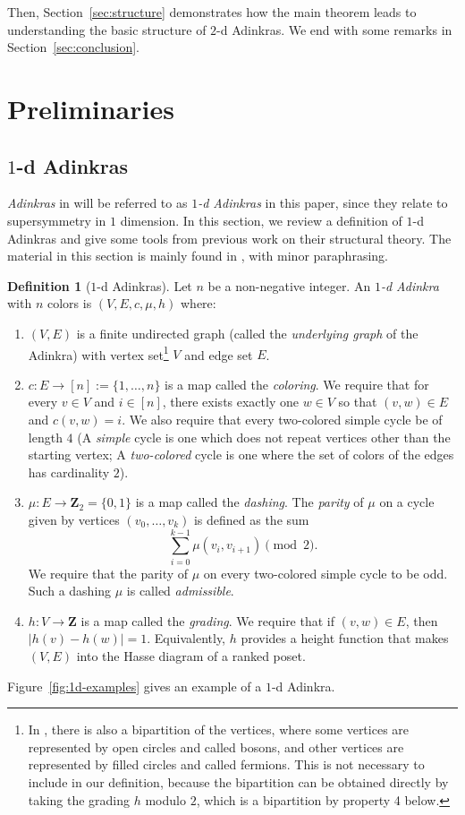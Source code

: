 \documentclass[12pt,twoside,singlespace]{article}
\numberwithin{equation}{section}
\theoremstyle{definition}
\newtheorem{definition}[equation]{Definition}
\newcommand{\ZZ}{\mathbf{Z}}
\begin{document}
Then, Section~\ref{sec:structure} demonstrates how the main theorem leads to understanding the basic structure of $2$-d Adinkras. We end with some remarks in Section~\ref{sec:conclusion}.

\section{Preliminaries}
\label{sec:prelim}

\subsection{$1$-d Adinkras}
\label{sec:1d}
\emph{Adinkras} in \cite{d2l:first,d2l:graph-theoretic,zhang:adinkras} will be referred to as \emph{$1$-d Adinkras} in this paper, since they relate to supersymmetry in $1$ dimension. In this section, we  review a definition of $1$-d Adinkras and give some tools from previous work on their structural theory. The material in this section is mainly found in \cite{d2l:omni,zhang:adinkras}, with minor paraphrasing. 


\begin{definition}[$1$-d Adinkras]
Let $n$ be a non-negative integer.  An \emph{$1$-d Adinkra} with $n$ colors is $(V,E,c,\mu,h)$ where: 

\begin{enumerate}
\item $(V,E)$ is a finite undirected graph (called the \emph{underlying graph} of the Adinkra) with vertex set\footnote{In \cite{d2l:first,d2l:graph-theoretic}, there is also a bipartition of the vertices, where some vertices are represented by open circles and called bosons, and other vertices are represented by filled circles and called fermions.  This is not necessary to include in our definition, because the bipartition can be obtained directly by taking the grading $h$ modulo $2$, which is a bipartition by property 4 below.} $V$ and edge set $E$.
\item $c:E\to [n] := \{1,\ldots,n\}$ is a map called the \emph{coloring}. We require that for every $v\in V$ and $i \in [n]$, there exists exactly one $w\in V$ so that $(v,w)\in E$ and $c(v,w)=i$. We also require that every two-colored simple cycle be of length $4$ (A \emph{simple} cycle is one which does not repeat vertices other than the starting vertex; A \emph{two-colored} cycle is one where the set of colors of the edges has cardinality $2$).
\item $\mu:E\to \ZZ_2=\{0,1\}$ is a map called the \emph{dashing}.  The \emph{parity} of $\mu$ on a cycle given by vertices $(v_0,\ldots,v_k)$ is defined as the sum
\[\sum_{i=0}^{k-1}\mu(v_i,v_{i+1})\pmod{2}.\]
We require that the parity of $\mu$ on every two-colored simple cycle to be odd. Such a dashing $\mu$ is called \emph{admissible}.
\item $h:V\to\ZZ$ is a map called the \emph{grading}. We require that if $(v,w)\in E$, then $|h(v)-h(w)|=1$. Equivalently, $h$ provides a height function that makes $(V,E)$ into the Hasse diagram of a ranked poset.
\end{enumerate}

Figure~\ref{fig:1d-examples} gives an example of a $1$-d Adinkra.
\end{definition}
\end{document}
